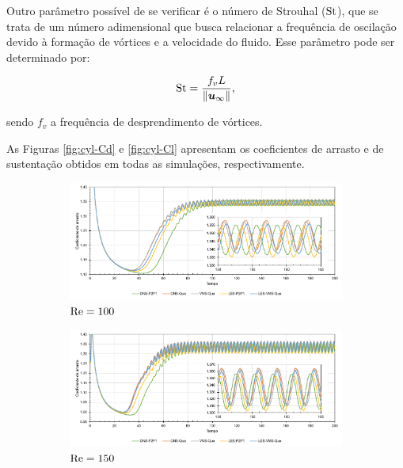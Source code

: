 Outro parâmetro possível de se verificar é o número de Strouhal ($\mathrm{St}$), que se trata de um número adimensional que busca relacionar a frequência de oscilação devido à formação de vórtices e a velocidade do fluido. Esse parâmetro pode ser determinado por:

\begin{equation}
    \mathrm{St}=\frac{f_vL}{\left\lVert{\boldsymbol{u}_\infty}\right\lVert}\text{,}
\end{equation}

\noindent sendo $f_v$ a frequência de desprendimento de vórtices.

As Figuras \ref{fig:cyl-Cd} e \ref{fig:cyl-Cl} apresentam os coeficientes de arrasto e de sustentação obtidos em todas as simulações, respectivamente.

\begin{figure}[h!]
    \centering
    \caption{Escoamento sobre cilindro - Coeficiente de arrasto ao longo do tempo.}
    \begin{subfigure}{\textwidth}
        \includegraphics[width=\linewidth]{Figuras/cylinder/analise3/Cd-100.pdf}
        \caption{$\mathrm{Re}=100$}
    \end{subfigure}
    \begin{subfigure}{\textwidth}
        \includegraphics[width=\linewidth]{Figuras/cylinder/analise3/Cd-150.pdf}
        \caption{$\mathrm{Re}=150$}
    \end{subfigure}
    \begin{subfigure}{\textwidth}

\end{subfigure}
\end{figure}
